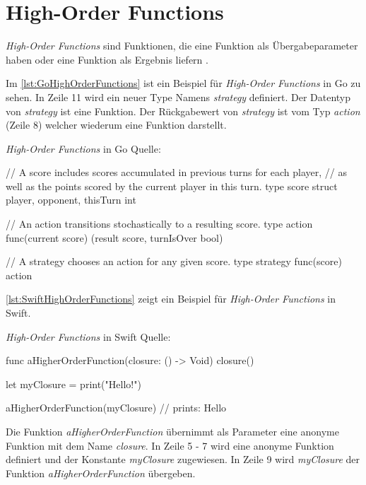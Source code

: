 \section{High-Order Functions}
\textit{High-Order Functions} sind Funktionen, die eine Funktion als Übergabeparameter haben oder eine Funktion als Ergebnis liefern \cite[S.63]{Piepmeyer.2010}.

Im \autoref{lst:GoHighOrderFunctions} ist ein Beispiel für \textit{High-Order Functions} in Go zu sehen. 
In Zeile 11 wird ein neuer Type Namens \textit{strategy} definiert. 
Der Datentyp von \textit{strategy} ist eine Funktion.
Der Rückgabewert von \textit{strategy} ist vom Typ \textit{action} (Zeile 8) welcher wiederum eine Funktion darstellt.

\begin{listing}[H]
\caption{\textit{High-Order Functions} in Go Quelle: \cite[]{Go.HighOrderFunctions}}
\label{lst:GoHighOrderFunctions}
\begin{GoCode}
// A score includes scores accumulated in previous turns for each player,
// as well as the points scored by the current player in this turn.
type score struct {
    player, opponent, thisTurn int
}

// An action transitions stochastically to a resulting score.
type action func(current score) (result score, turnIsOver bool)

// A strategy chooses an action for any given score.
type strategy func(score) action
\end{GoCode}
\end{listing}

\autoref{lst:SwiftHighOrderFunctions} zeigt ein Beispiel für \textit{High-Order Functions} in Swift.

\begin{listing}[H]
\caption{\textit{High-Order Functions} in Swift Quelle: \cite[]{Swift.HighOrderFunctions}}
\label{lst:SwiftHighOrderFunctions}
\begin{SwiftCode}
func aHigherOrderFunction(closure: () -> Void) {
    closure()
}

let myClosure = {
    print("Hello!")
}

aHigherOrderFunction(myClosure) // prints: Hello
\end{SwiftCode}
\end{listing}

Die Funktion \textit{aHigherOrderFunction} übernimmt als Parameter eine anonyme Funktion mit dem Name \textit{closure}.
In Zeile 5 - 7 wird eine anonyme Funktion definiert und der Konstante \textit{myClosure} zugewiesen.
In Zeile 9 wird \textit{myClosure} der Funktion \textit{aHigherOrderFunction} übergeben.



